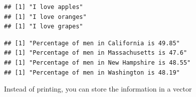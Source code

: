 \documentclass[
]{book}
\newenvironment{Shaded}{\begin{snugshade}}{\end{snugshade}}
\newcommand{\ControlFlowTok}[1]{\textcolor[rgb]{0.13,0.29,0.53}{\textbf{#1}}}
\newcommand{\DataTypeTok}[1]{\textcolor[rgb]{0.13,0.29,0.53}{#1}}
\newcommand{\DecValTok}[1]{\textcolor[rgb]{0.00,0.00,0.81}{#1}}
\newcommand{\KeywordTok}[1]{\textcolor[rgb]{0.13,0.29,0.53}{\textbf{#1}}}
\newcommand{\NormalTok}[1]{#1}
\newcommand{\OperatorTok}[1]{\textcolor[rgb]{0.81,0.36,0.00}{\textbf{#1}}}
\newcommand{\StringTok}[1]{\textcolor[rgb]{0.31,0.60,0.02}{#1}}
\theoremstyle{definition}
\theoremstyle{definition}
\theoremstyle{definition}
\theoremstyle{definition}
\theoremstyle{remark}
\begin{document}
\begin{verbatim}
## [1] "I love apples"
## [1] "I love oranges"
## [1] "I love grapes"
\end{verbatim}

\begin{Shaded}
\end{Shaded}

\begin{verbatim}
## [1] "Percentage of men in California is 49.85"
## [1] "Percentage of men in Massachusetts is 47.6"
## [1] "Percentage of men in New Hampshire is 48.55"
## [1] "Percentage of men in Washington is 48.19"
\end{verbatim}

Instead of printing, you can store the information in a vector
\end{document}
